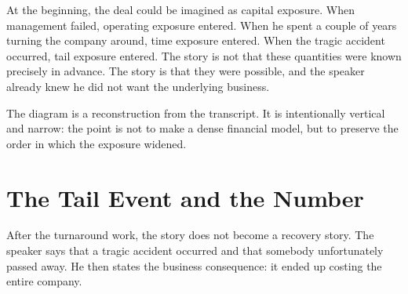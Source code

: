 At the beginning, the deal could be imagined as capital exposure. When management failed, operating exposure entered. When he spent a couple of years turning the company around, time exposure entered. When the tragic accident occurred, tail exposure entered. The story is not that these quantities were known precisely in advance. The story is that they were possible, and the speaker already knew he did not want the underlying business.

\begin{figure}
\centering
{}
\end{figure}

The diagram is a reconstruction from the transcript. It is intentionally vertical and narrow: the point is not to make a dense financial model, but to preserve the order in which the exposure widened.

\section{The Tail Event and the Number}

After the turnaround work, the story does not become a recovery story. The speaker says that a tragic accident occurred and that somebody unfortunately passed away. He then states the business consequence: it ended up costing the entire company.

